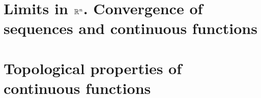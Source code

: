 \section{Limits in $\Rtn$. Convergence of sequences and continuous functions}

\section{Topological properties of continuous functions}
